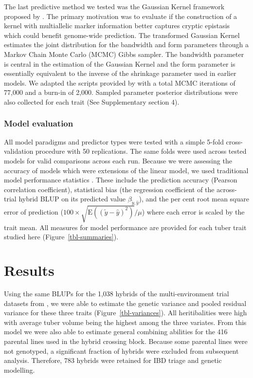 The last predictive method we tested was the Gaussian Kernel framework
proposed by \autocite{Perez-Elizalde2015}. The primary motivation was to
evaluate if the construction of a kernel with multiallelic marker
information better captures cryptic epistasis which could benefit
genome-wide prediction. The transformed Gaussian Kernel estimates the
joint distribution for the bandwidth and form parameters through a
Markov Chain Monte Carlo (MCMC) Gibbs sampler. The bandwidth parameter
is central in the estimation of the Gaussian Kernel and the form
parameter is essentially equivalent to the inverse of the shrinkage
parameter used in earlier models. We adapted the scripts provided by
\autocite{Perez-Elizalde2015} with a total MCMC iterations of 77,000 and
a burn-in of 2,000. Sampled parameter posterior distributions were also collected for each trait (See Supplementary section 4).

\hypertarget{model-evaluation}{%
\subsubsection{Model evaluation}\label{model-evaluation}}

All model paradigms and predictor types were tested with a simple 5-fold
cross-validation procedure with 50 replications. The same folds were
used across tested models for valid comparisons across each run. Because
we were assessing the accuracy of models which were extensions of the linear model, we used traditional model
performance statistics \autocite{Hsu2017}. These include the prediction
accuracy (Pearson correlation coefficient), statistical bias (the
regression coefficient of the across-trial hybrid BLUP on its predicted value
\(\beta_{\tilde{y}, \hat{y}}\)), and the per cent root mean square error
of prediction
(\(100 \times \sqrt{\mathrm{E}\left ((\tilde{y} - \hat{y}) ^ 2 \right )} / \mu\))
where each error is scaled by the trait mean. All measures for model
performance are provided for each tuber trait studied here
(Figure~\ref{tbl-summaries}).

\hypertarget{results}{%
\section{Results}\label{results}}

Using the same BLUPs for the 1,038 hybrids of the multi-environment
trial datasets from \autocite{Adams2023}, we were able to estimate the
genetic variance and pooled residual variance for these three traits
(Figure~\ref{tbl-variances}). All heritibalities were high with average
tuber volume being the highest among the three variates. From this model
we were also able to estimate general combining abilities for the 416
parental lines used in the hybrid crossing block. Because some parental
lines were not genotyped, a significant fraction of hybrids were
excluded from subsequent analysis. Therefore, 783 hybrids were retained
for IBD triage and genetic modelling.

